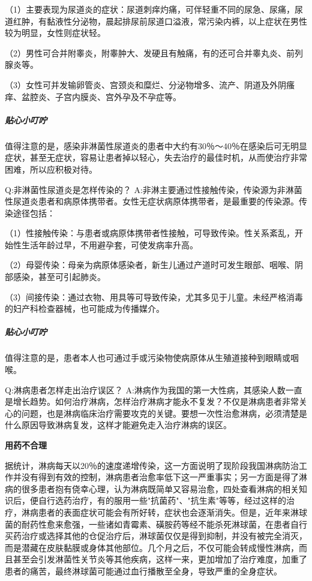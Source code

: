 \documentclass[12pt,UTF8]{ctexbook}
\begin{document}
（1）主要表现为尿道炎的症状：尿道刺痒灼痛，可伴轻重不同的尿急、尿痛，尿道红肿，有黏液性分泌物，晨起排尿前尿道口溢液，常污染内裤，以上症状在男性较为明显，女性则症状轻。

（2）男性可合并附睾炎，附睾肿大、发硬且有触痛，有的还可合并睾丸炎、前列腺炎等。

（3）女性可并发输卵管炎、宫颈炎和糜烂、分泌物增多、流产、阴道及外阴瘙痒、盆腔炎、子宫内膜炎、宫外孕及不孕症等。

\subparagraph{贴心小叮咛}

值得注意的是，感染非淋菌性尿道炎的患者中大约有30％～40％在感染后可无明显症状，甚至无症状，容易让患者掉以轻心，失去治疗的最佳时机，从而使治疗非常困难，所以应积极对待。

Q:非淋菌性尿道炎是怎样传染的？
A:非淋主要通过性接触传染，传染源为非淋菌性尿道炎患者和病原体携带者。女性无症状病原体携带者，是最重要的传染源。传染途径包括：

（1）性接触传染：与患者或病原体携带者性接触，可导致传染。性关系紊乱，开始性生活年龄过早，不用避孕套，可使发病率升高。

（2）母婴传染：母亲为病原体感染者，新生儿通过产道时可发生眼部、咽喉、阴部感染，甚至可引起肺炎。

（3）间接传染：通过衣物、用具等可导致传染，尤其多见于儿童。未经严格消毒的妇产科检查器械，也可能成为传播媒介。

\subparagraph{贴心小叮咛}

值得注意的是，患者本人也可通过手或污染物使病原体从生殖道接种到眼睛或咽喉。

Q:淋病患者怎样走出治疗误区？
A:淋病作为我国的第一大性病，其感染人数一直是增长趋势。如何治疗淋病，怎样治疗淋病才能永不复发？不仅是淋病患者非常关心的问题，也是淋病临床治疗需要攻克的关键。要想一次性治愈淋病，必须清楚是什么原因导致淋病复发，这样才能避免走入治疗淋病的误区。

\textbf{用药不合理}

据统计，淋病每天以20％的速度递增传染，这一方面说明了现阶段我国淋病防治工作并没有得到有效的控制，淋病患者治愈率低下这一严重事实；另一方面是得了淋病的很多患者抱有侥幸心理，认为淋病既简单又容易治愈，四处查看淋病的相关知识后，便自行选药治疗，有的服用一些"抗菌药"、"抗生素"等等，经过这样的治疗，淋病患者的表面症状可能会有所好转，症状也会逐渐消失。但是，近年来淋球菌的耐药性愈来愈强，一些诸如青霉素、磺胺药等经不能杀死淋球菌，在患者自行买药治疗或选择其他的仓促治疗后，淋球菌仅仅是得到抑制，并没有被完全消灭，而是潜藏在皮肤黏膜或身体其他部位。几个月之后，不仅可能会转成慢性淋病，而且甚至会引发淋菌性关节炎等其他疾病，这样一来，更加增加了治疗难度，加重了患者的痛苦，最终淋球菌可能通过血行播散至全身，导致严重的全身症状。
\end{document}
